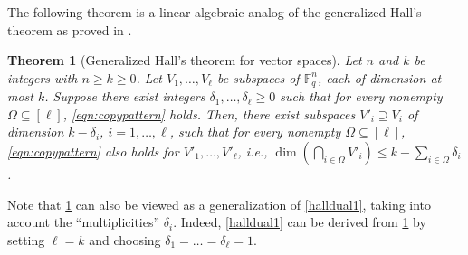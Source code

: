 \documentclass[11pt]{article}
\theoremstyle{plain}
\newtheorem{thm}{Theorem}[section]
\theoremstyle{definition}
\theoremstyle{remark}
\newcommand{\F}{\mathbb{F}}
\begin{document}
The following theorem is a linear-algebraic analog of the generalized Hall's theorem as proved in \cite{brakensiek2023generic}. 

\begin{thm}[Generalized Hall's theorem for vector spaces]\label{thm:extend}
Let $n$ and $k$ be integers with $n\ge k\geq 0$. Let $V_1,\ldots,V_\ell$ be subspaces of $\F_q^n$, each of dimension at most $k$. Suppose there exist integers $\delta_1,\ldots,\delta_\ell\geq 0$ such that for every nonempty $\Omega\subseteq [\ell]$, \eqref{eqn:copypattern} holds. Then, there exist subspaces $V'_i\supseteq V_i$ of dimension $k-\delta_i$, $i=1,\dots,\ell$, such that for every nonempty $\Omega\subseteq [\ell]$, \eqref{eqn:copypattern} also holds for $V'_1,\ldots,V'_\ell$, i.e., $\dim\left(\bigcap_{i\in \Omega} V'_i\right)\leq k-\sum_{i\in \Omega}\delta_i$.
\end{thm}

Note that \cref{thm:extend} can also be viewed as a generalization of \cref{halldual1}, taking into account the ``multiplicities'' $\delta_i$. Indeed, \cref{halldual1} can be derived from \cref{thm:extend} by setting $\ell=k$ and choosing $\delta_1 = \dots = \delta_\ell = 1$.
\end{document}
